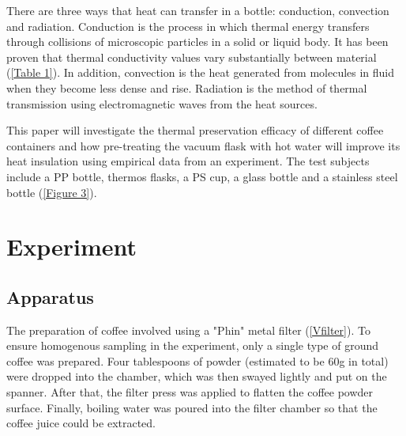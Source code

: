 \documentclass[11pt]{article}
\begin{document}
There are three ways that heat can transfer in a bottle: conduction, convection and radiation. Conduction is the process in which thermal energy transfers through collisions of microscopic particles in a solid or liquid body. It has been proven that thermal conductivity values vary substantially between material (\autoref{Table 1}). In addition, convection is the heat generated from molecules in fluid when they become less dense and rise. Radiation is the method of thermal transmission using electromagnetic waves from the heat sources.  

This paper will investigate the thermal preservation efficacy of different coffee containers and how pre-treating the vacuum flask with hot water will improve its heat insulation using empirical data from an experiment. The test subjects include a PP bottle, thermos flasks, a PS cup, a glass bottle and a stainless steel bottle (\autoref{Figure 3}). 
\section*{Experiment}

\subsection*{Apparatus}

The preparation of coffee involved using a "Phin" metal filter (\autoref{Vfilter}).  To ensure homogenous sampling in the experiment,  only a single type of ground coffee was prepared. Four tablespoons of powder (estimated to be 60g in total) were dropped into the chamber, which was then swayed lightly and put on the spanner. After that, the filter press was applied to flatten the coffee powder surface. Finally, boiling water was poured into the filter chamber so that the coffee juice could be extracted. 
\end{document}
